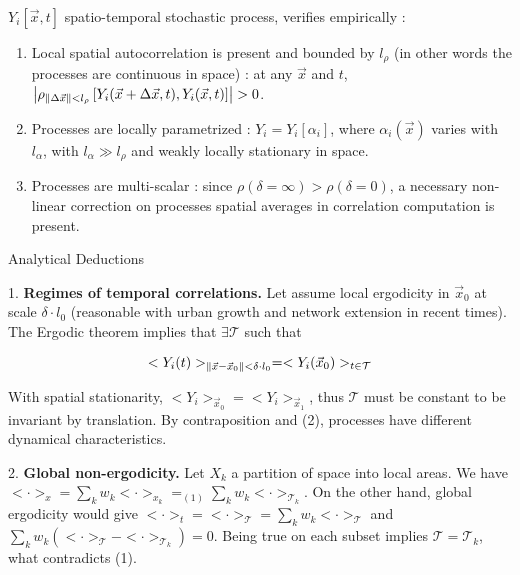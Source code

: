 $Y_i\left[\vec{x},t\right]$ spatio-temporal stochastic process, verifies empirically :

\bigskip

\begin{enumerate}
\item Local spatial autocorrelation is present and bounded by $l_{\rho}$ (in other words the processes are continuous in space) : at any $\vec{x}$ and $t$, $\left|\rho_{\| \Delta \vec{x} \| < l_{\rho}}\left[Y_i (\vec{x}+\Delta \vec{x},t), Y_i (\vec{x},t) \right]\right| > 0$.
\medskip
\item Processes are locally parametrized : $Y_i = Y_i\left[\alpha_i\right]$, where $\alpha_i (\vec{x})$ varies with $l_{\alpha}$, with $l_{\alpha} \gg l_{\rho}$ and weakly locally stationary in space.
\medskip
\item Processes are multi-scalar : since $\rho(\delta = \infty) > \rho (\delta = 0 )$, a necessary non-linear correction on processes spatial averages in correlation computation is present.
\end{enumerate}



Analytical Deductions

1. \textbf{Regimes of temporal correlations.} Let assume local ergodicity in $\vec{x}_0$ at scale $\delta \cdot l_0$ (reasonable with urban growth and network extension in recent times). The Ergodic theorem implies that $\exists \mathcal{T}$ such that

\[<Y_i (t) >_{\| \vec{x}-\vec{x}_0 \| < \delta\cdot l_0} = <Y_i (\vec{x}_0)>_{t\in \mathcal{T}}\] 

With spatial stationarity, $<Y_i>_{\vec{x}_0}=<Y_i>_{\vec{x}_1}$, thus $\mathcal{T}$ must be constant to be invariant by translation. By contraposition and (2), processes have different dynamical characteristics.

\bigskip

2. \textbf{Global non-ergodicity.} Let $X_k$ a partition of space into local areas. We have $<\cdot>_x = \sum_k w_k <\cdot>_{x_k} =_{(1)} \sum_k w_k <\cdot>_{\mathcal{T}_k} $. On the other hand, global ergodicity would give $<\cdot>_t = <\cdot>_{\mathcal{T}} = \sum_k w_k <\cdot>_{\mathcal{T}}$ and $\sum_k w_k \left(<\cdot>_{\mathcal{T}} - <\cdot>_{\mathcal{T}_k}\right) = 0$. Being true on each subset implies $\mathcal{T}=\mathcal{T}_k$, what contradicts (1).





